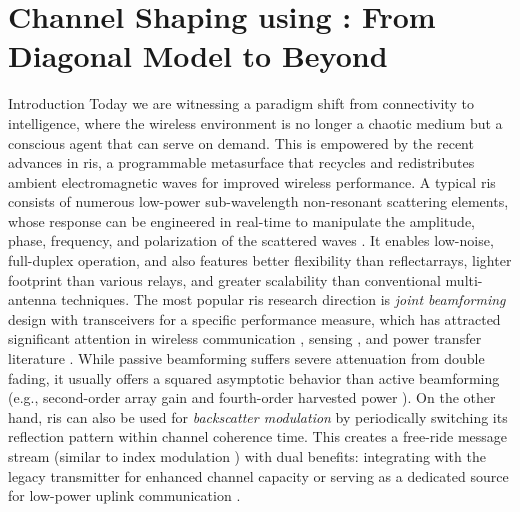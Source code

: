 
\graphicspath{{assets/chapter_5/}}

\chapter{Channel Shaping using : From Diagonal Model to Beyond}\label{ch:channel_shaping}




\begin{section}{Introduction}
	Today we are witnessing a paradigm shift from connectivity to intelligence, where the wireless environment is no longer a chaotic medium but a conscious agent that can serve on demand.
	This is empowered by the recent advances in \gls{ris}, a programmable metasurface that recycles and redistributes ambient electromagnetic waves for improved wireless performance.
	A typical \gls{ris} consists of numerous low-power sub-wavelength non-resonant scattering elements, whose response can be engineered in real-time to manipulate the amplitude, phase, frequency, and polarization of the scattered waves \cite{Basar2019}.
	It enables low-noise, full-duplex operation, and also features better flexibility than reflectarrays, lighter footprint than various relays, and greater scalability than conventional multi-antenna techniques.
	The most popular \gls{ris} research direction is \emph{joint beamforming} design with transceivers for a specific performance measure, which has attracted significant attention in wireless communication \cite{Wu2019,Guo2020,Liu2022}, sensing \cite{He2022,Luo2022,Hua2023}, and power transfer literature \cite{Wu2020a,Feng2022,Zhao2022}.
	While passive beamforming suffers severe attenuation from double fading, it usually offers a squared asymptotic behavior than active beamforming (e.g., second-order array gain and fourth-order harvested power \cite{Zhao2022}).
	On the other hand, \gls{ris} can also be used for \emph{backscatter modulation} by periodically switching its reflection pattern within channel coherence time.
	This creates a free-ride message stream (similar to index modulation \cite{Basar2017}) with dual benefits: integrating with the legacy transmitter for enhanced channel capacity \cite{Karasik2020,Basar2020,Ye2022} or serving as a dedicated source for low-power uplink communication \cite{Liang2020,Zhao2024,Yang2024}.

\end{section}
